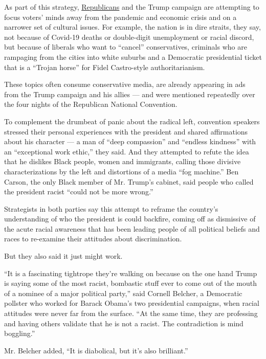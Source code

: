 As part of this strategy,
\href{https://www.nytimes3xbfgragh.onion/2020/09/08/us/politics/trump-republicans-fear-strategy.html}{Republicans}
and the Trump campaign are attempting to focus voters' minds away from
the pandemic and economic crisis and on a narrower set of cultural
issues. For example, the nation is in dire straits, they say, not
because of Covid-19 deaths or double-digit unemployment or racial
discord, but because of liberals who want to ``cancel'' conservatives,
criminals who are rampaging from the cities into white suburbs and a
Democratic presidential ticket that is a ``Trojan horse'' for Fidel
Castro-style authoritarianism.

These topics often consume conservative media, are already appearing in
ads from the Trump campaign and his allies --- and were mentioned
repeatedly over the four nights of the Republican National Convention.

To complement the drumbeat of panic about the radical left, convention
speakers stressed their personal experiences with the president and
shared affirmations about his character --- a man of ``deep compassion''
and ``endless kindness'' with an ``exceptional work ethic,'' they said.
And they attempted to refute the idea that he dislikes Black people,
women and immigrants, calling those divisive characterizations by the
left and distortions of a media ``fog machine.'' Ben Carson, the only
Black member of Mr. Trump's cabinet, said people who called the
president racist ``could not be more wrong.''

Strategists in both parties say this attempt to reframe the country's
understanding of who the president is could backfire, coming off as
dismissive of the acute racial awareness that has been leading people of
all political beliefs and races to re-examine their attitudes about
discrimination.

But they also said it just might work.

``It is a fascinating tightrope they're walking on because on the one
hand Trump is saying some of the most racist, bombastic stuff ever to
come out of the mouth of a nominee of a major political party,'' said
Cornell Belcher, a Democratic pollster who worked for Barack Obama's two
presidential campaigns, when racial attitudes were never far from the
surface. ``At the same time, they are professing and having others
validate that he is not a racist. The contradiction is mind boggling.''

Mr. Belcher added, ``It is diabolical, but it's also brilliant.''


